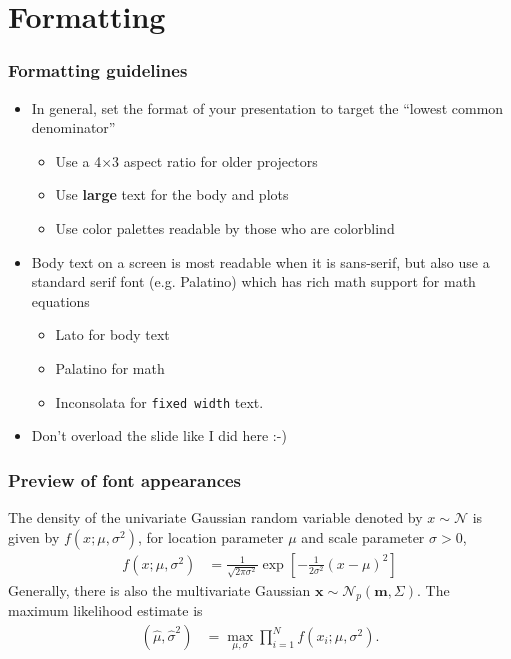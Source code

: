 \section{Formatting}


\begin{frame}
  \frametitle{Formatting guidelines}
  \begin{itemize}
  \item In general, set the format of your presentation to target the
    ``lowest common denominator''
    \begin{itemize}
    \item Use a 4$\times$3 aspect ratio for older projectors
    \item Use \textbf{large} text for the body and plots
    \item Use color palettes readable by those who are colorblind
    \end{itemize}
  \item Body text on a screen is most readable when it is sans-serif,
    but also use a standard serif font (e.g. Palatino) which has rich
    math support for math equations
    \begin{itemize}
    \item Lato for body text
    \item Palatino for math
    \item Inconsolata for \texttt{fixed width} text.
    \end{itemize}
  \item Don't overload the slide like I did here :-)
  \end{itemize}
\end{frame}


\begin{frame}
  \frametitle{Preview of font appearances}

  The density of the univariate Gaussian random variable denoted by
  $x \sim \mathcal{N}$ is given by $f(x; \mu, \sigma^2)$, for location
  parameter $\mu$ and scale parameter $\sigma > 0$,
%
  \begin{align*}
    f(x; \mu, \sigma^2) &= \frac{1}{\sqrt{2\pi\sigma^2}} \exp 
           \left[
           -\frac{1}{2\sigma^2}(x - \mu)^2
           \right]
  \end{align*}
%
  Generally, there is also the multivariate Gaussian
  $\mathbf{x} \sim \mathcal{N}_p(\mathbf{m}, \Sigma)$. The maximum
  likelihood estimate is
  \begin{align*}
    (\hat{\mu}, \hat{\sigma}^2) &= \max_{\mu, \sigma} \prod_{i=1}^N f(x_i; \mu, \sigma^2).
  \end{align*}
  
\end{frame}



